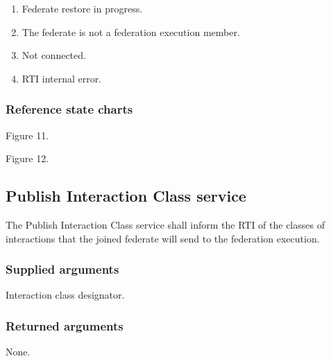 \begin{compactstdpage}
    \begin{enumerate}[label=\alph*),leftmargin=2.35em,itemsep=1pt,topsep=3pt,parsep=0pt,start=5]
\item Federate restore in progress.
\item The federate is not a federation execution member.
\item Not connected.
\item RTI internal error.
    \end{enumerate}

    \subsubsection{Reference state charts}
    \begin{stdalphalist}
        \item Figure 11.
        \item Figure 12.
    \end{stdalphalist}

    \subsection{Publish Interaction Class service}

    The Publish Interaction Class service shall inform the RTI of the classes of interactions that the joined federate will send to the federation execution.

    \subsubsection{Supplied arguments}
    \begin{stdalphalist}
        \item Interaction class designator.
    \end{stdalphalist}

    \subsubsection{Returned arguments}
    \begin{stdalphalist}
        \item None.
    \end{stdalphalist}


\end{compactstdpage}
